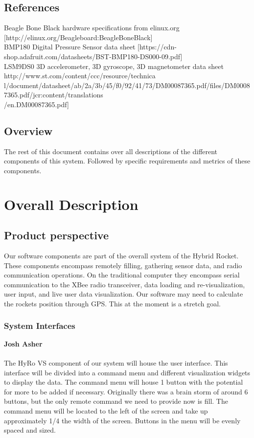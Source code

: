 \documentclass[10pt,draftclsnofoot,onecolumn,compsoc]{IEEEtran}
\begin{document}
\subsection{ References}
Beagle Bone Black hardware specifications from elinux.org [http://elinux.org/Beagleboard:BeagleBoneBlack]\\
BMP180 Digital Pressure Sensor data sheet [https://cdn-shop.adafruit.com/datasheets/BST-BMP180-DS000-09.pdf]\\
LSM9DS0 3D accelerometer, 3D gyroscope, 3D magnetometer data sheet http://www.st.com/content/ccc/resource/technica\\l/document/datasheet/ab/2a/3b/45/f0/92/41/73/DM00087365.pdf/files/DM00087365.pdf/jcr:content/translations\\/en.DM00087365.pdf]
\subsection{Overview}
The rest of this document contains over all descriptions of the different components of this system. Followed by specific requirements and metrics of these components.

\section{ Overall Description}
\subsection{ Product perspective}
Our software components are part of the overall system of the Hybrid Rocket. These components encompass remotely filling, gathering sensor data, and radio communication operations.  On the traditional computer they encompass serial communication to the XBee radio transceiver, data loading and re-visualization, user input, and live user data visualization. Our software may need to calculate the rockets position through GPS. This at the moment is a stretch goal.

\subsubsection{System Interfaces}
{\bf Josh Asher }
\\ \\
The HyRo VS component of our system will house the user interface. This interface will be divided into a command menu and different visualization widgets to display the data. The command menu will house 1 button with the potential for more to be added if necessary. Originally there was a brain storm of around 6 buttons, but the only remote command we need to provide now is fill. The command menu will be located to the left of the screen and take up approximately 1/4 the width of the screen. Buttons in the menu will be evenly spaced and sized. \par
\end{document}
